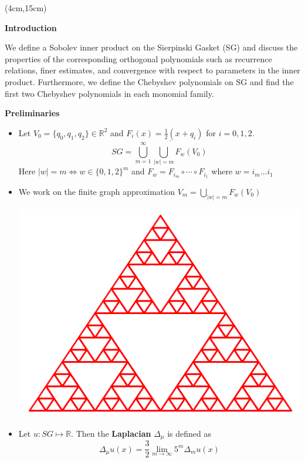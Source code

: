 \documentclass[a0, landscape]{a0poster}
\begin{document}
{%
\begin{textblock*}{10.75in}(4cm,15cm)%
    \begin{minipage}{10.75in} 
    \begin{center}
            {\LARGE \textcolor{CornellRed}{\textbf{Introduction}}}
        \end{center}
        \vspace{1cm}
        We define a Sobolev inner product on the Sierpinski Gasket (SG) and discuss the properties of the corresponding orthogonal polynomials such as recurrence relations, finer estimates, and convergence with respect to parameters in the inner product. Furthermore, we define the Chebyshev polynomials on SG and find the first two Chebyshev polynomials in each monomial family. 
        \vspace{1cm}
        \begin{center}
            {\LARGE \textcolor{CornellRed}{\textbf{Preliminaries}}}
        \end{center}
        \vspace{1cm}
        \begin{itemize}
            \item Let $V_0 = \{q_0, q_1, q_2\} \in \mathbb{R}^2$ and $F_i(x) = \frac{1}{2}(x+q_i)$ for $i=0,1,2$.
            $$SG = \overline{\bigcup_{m=1}^{\infty}\bigcup_{|w|=m}F_w(V_0)}$$
            Here $|w| = m \iff w \in \{0,1,2\}^{m}$ and $F_w = F_{i_m}\circ \cdots \circ F_{i_1}$ where $w = i_m\ldots i_1$
            \item We work on the finite graph approximation $V_m = \bigcup_{|w|=m}F_{w}(V_0)$
            \begin{center}
            \includegraphics[width=0.45\linewidth]{Final_presentation/images/V4.png}
            \label{fig:V4}    
            \end{center}
            \item Let $u: SG \mapsto \mathbb{R}$. Then the \textbf{Laplacian} $\Delta_{\mu}$ is 					defined as
        $$  \Delta_{\mu}u(x) = \frac{3}{2}\lim_{m \to \infty}5^m\Delta_mu(x)$$

\end{itemize}
\end{minipage}
\end{textblock*}}
\end{document}
